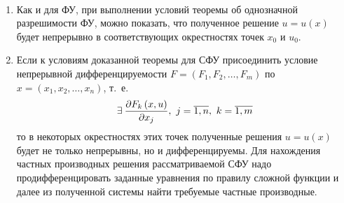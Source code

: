 \documentclass[../main.tex]{subfiles}
\begin{document}
\begin{rems}

~

    \begin{enumerate}
        \item Как и для ФУ, при выполнении условий 
        теоремы об однозначной разрешимости ФУ, можно показать,
        что полученное решение $u = u\left(x\right)$
        будет непрерывно в соответствующих окрестностях
        точек $x_0$ и $u_0$.
        \item Если к условиям доказанной теоремы для
        СФУ присоединить условие непрерывной 
        дифференцируемости
        $F = \left(F_1, F_2, \dots, F_m\right)$ по
        $x = \left(x_1, x_2, \dots, x_n\right)$, т.~е. 
        \[\exists\:
        \pderiv{F_k\left(x, u\right)}{x_j},\ 
        j = \overline{1, n},\ k = \overline{1, m}\] то в некоторых окрестностях
        этих точек полученные решения 
        $u = u\left(x\right)$ будет не только 
        непрерывны, но и дифференцируемы.
        Для нахождения частных производных решения
        рассматриваемой СФУ надо продифференцировать
        заданные уравнения по правилу сложной функции и
        далее из полученной системы найти требуемые частные производные. 
    \end{enumerate}
\end{rems}
\end{document}
